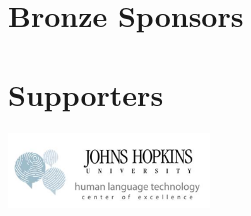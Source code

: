 \section*{Bronze Sponsors}
\begin{center}
\hspace{0.05\textwidth}
\end{center}

\section*{Supporters}
\begin{center}
\includegraphics[width=0.4\textwidth]{logos/hltcoe-side-balloons.png}
\end{center}

\clearpage

\renewcommand{\leftheader}{}
\renewcommand{\rightheader}{}
